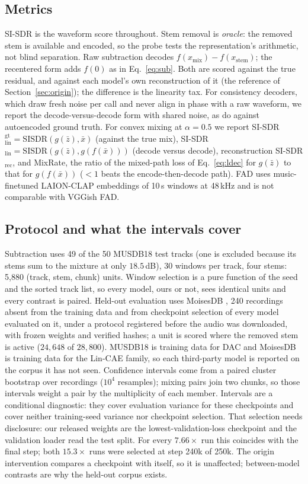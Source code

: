 \documentclass[conference]{IEEEtran}
\newcommand{\secref}[1]{Section~\ref{#1}}
\begin{document}
\subsection{Metrics}\label{sec:metrics}
SI-SDR \cite{leroux2019sdr} is the waveform score throughout. Stem removal is
\emph{oracle}: the removed stem is available and encoded, so the probe tests
the representation's arithmetic, not blind separation. Raw subtraction
decodes $f(x_\mathrm{mix}){-}f(x_\mathrm{stem})$; the recentered form adds
$f(0)$ as in Eq.~\ref{eq:sub}. Both are scored against the true residual,
and against each model's own reconstruction of it (the reference of
\secref{sec:origin}); the difference is the linearity tax. For consistency
decoders, which draw fresh noise per call and never align in phase with a raw
waveform, we report the decode-versus-decode form with shared noise, as
\cite{torres2026linearity} do against autoencoded ground truth. For convex
mixing at $\alpha{=}0.5$ we report
SI-SDR$_\mathrm{lin}^\mathrm{gt}=\mathrm{SISDR}(g(\bar{z}),\bar{x})$
(against the true mix), SI-SDR$_\mathrm{lin}=\mathrm{SISDR}(g(\bar{z}),g(f(\bar{x})))$
(decode versus decode), reconstruction SI-SDR$_\mathrm{rec}$, and MixRate, the
ratio of the mixed-path loss of Eq.~\ref{eq:ldec} for $g(\bar{z})$ to that
for $g(f(\bar{x}))$ ($<1$ beats the encode-then-decode path). FAD uses
music-finetuned LAION-CLAP embeddings of 10\,s windows at 48\,kHz and is not
comparable with VGGish FAD.

\subsection{Protocol and what the intervals cover}\label{sec:protocol-setup}
Subtraction uses 49 of the 50 MUSDB18 test tracks (one is excluded because
its stems sum to the mixture at only $18.5$\,dB), 30 windows per track, four
stems: 5{,}880 (track, stem, chunk) units. Window selection is a pure
function of the seed and the sorted track list, so every model, ours or not,
sees identical units and every contrast is paired. Held-out evaluation uses
MoisesDB \cite{pereira2023moisesdb}, 240 recordings absent from the training
data and from checkpoint selection of every model evaluated on it, under a
protocol registered before the audio was downloaded, with frozen weights and
verified hashes; a unit is scored where the removed stem is active
($24{,}648$ of $28{,}800$). MUSDB18 is training data for DAC and MoisesDB is
training data for the Lin-CAE family, so each third-party model is reported
on the corpus it has not seen. Confidence intervals come from a paired
cluster bootstrap over recordings ($10^4$ resamples); mixing pairs join two
chunks, so those intervals weight a pair by the multiplicity of each member.
Intervals are a conditional diagnostic: they cover evaluation variance for
these checkpoints and cover neither training-seed variance nor checkpoint
selection. That selection needs disclosure: our released weights are the
lowest-validation-loss checkpoint and the validation loader read the test
split. For every $7.66\times$ run this coincides with the final step; both
$15.3\times$ runs were selected at step 240k of 250k. The origin intervention
compares a checkpoint with itself, so it is unaffected; between-model
contrasts are why the held-out corpus exists.
\end{document}
